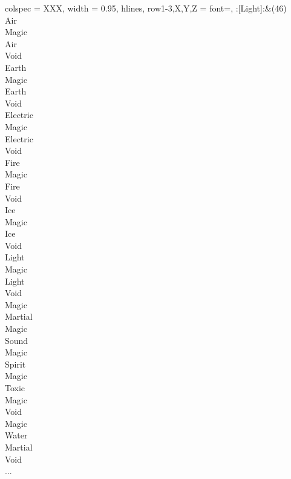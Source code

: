 \begin{longtblr}[
	caption = {2v1 Defending Weak},
	label = {2v1-Defending-Weak},
]{
	colspec = {XXX}, width = 0.95\linewidth,
	hlines,
	row{1-3,X,Y,Z} = {font=\bfseries},
}
	:[Light]:&{(46)\\
	Air \\
	Magic \\
	Air \\
	Void \\
	Earth \\
	Magic \\
	Earth \\
	Void \\
	Electric \\
	Magic \\
	Electric \\
	Void \\
	Fire \\
	Magic \\
	Fire \\
	Void \\
	Ice \\
	Magic \\
	Ice \\
	Void \\
	Light \\
	Magic \\
	Light \\
	Void \\
	Magic \\
	Martial \\
	Magic \\
	Sound \\
	Magic \\
	Spirit \\
	Magic \\
	Toxic \\
	Magic \\
	Void \\
	Magic \\
	Water \\
	Martial \\
	Void \\
	...\\
	}\\


\end{longtblr}
